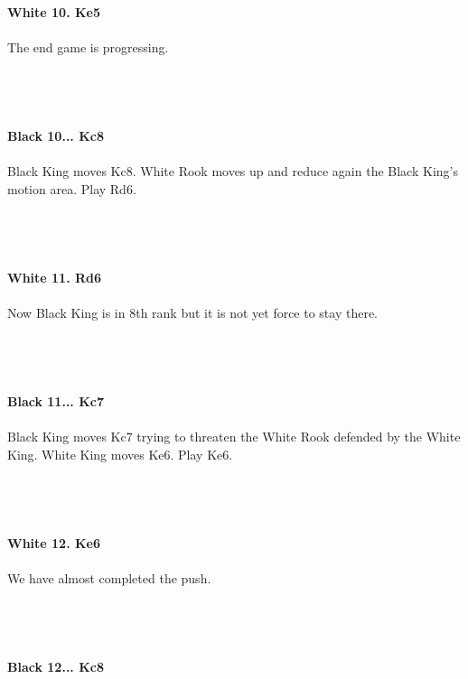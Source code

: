 \documentclass{article}
\begin{document}
\\

\\
\\
\textbf{White 10. Ke5}\\
\\
The end game is progressing.\\\\
\\

\\
\\
\textbf{Black 10... Kc8}\\
\\
Black King moves Kc8. White Rook moves up and reduce again the Black King's motion area. Play Rd6.\\\\
\\

\\
\\
\textbf{White 11. Rd6}\\
\\
Now Black King is in 8th rank but it is not yet force to stay there.\\\\
\\

\\
\\
\textbf{Black 11... Kc7}\\
\\
Black King moves Kc7 trying to threaten the White Rook defended by the White King. White King moves Ke6. Play Ke6.\\\\
\\

\\
\\
\textbf{White 12. Ke6}\\
\\
We have almost completed the push.\\\\
\\

\\
\\
\textbf{Black 12... Kc8}\\
\end{document}
